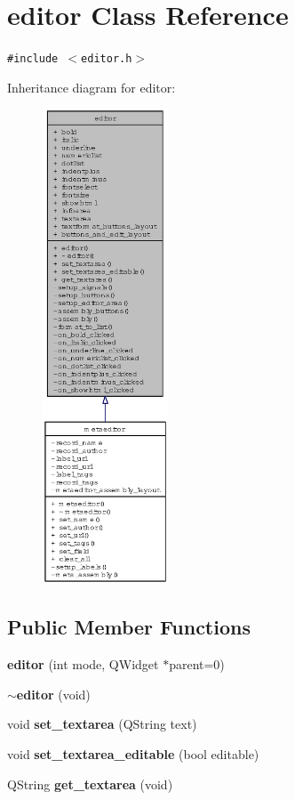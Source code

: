 \section{editor Class Reference}
\label{classeditor}
{\tt \#include $<$editor.h$>$}

Inheritance diagram for editor:\begin{figure}[H]
\begin{center}
\leavevmode
\includegraphics[width=106pt]{classeditor__inherit__graph}
\end{center}
\end{figure}
\subsection*{Public Member Functions}
\begin{CompactItemize}
\item 
{\bf editor} (int mode, QWidget $\ast$parent=0)
\item 
{\bf $\sim$editor} (void)
\item 
void {\bf set\_\-textarea} (QString text)
\item 
void {\bf set\_\-textarea\_\-editable} (bool editable)
\item 
QString {\bf get\_\-textarea} (void)
\end{CompactItemize}
